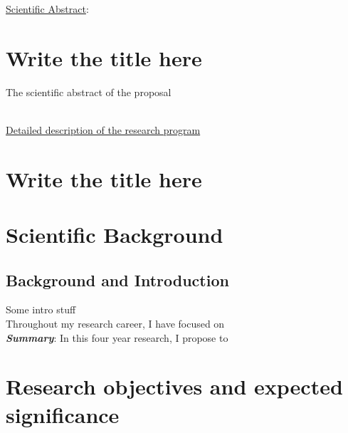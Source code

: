 \documentclass[a4paper,11pt]{article}
\title{\thetitle}
\author{}
\date{}
\begin{document}


\noindent\textsf{\underline{Scientific Abstract}:}

\section*{\centering Write the title here }

The scientific abstract of the proposal

\newpage



\Large\textsf{\\\underline{Detailed description of the research program}\\}
\normalsize

\section*{\vspace{-5px}\centering\LARGE   Write the title here}

\section{Scientific Background}
\label{sec:scientific_background}

\subsection{Background and Introduction}\label{sec:stateofart:intro}

Some intro stuff
\\


Throughout my research career, I have focused on 
\\

\noindent\textit{\textbf{Summary}}: 
In this four year research, I propose to

\section{Research objectives and expected significance}
\label{sec:objectives}
\end{document}
